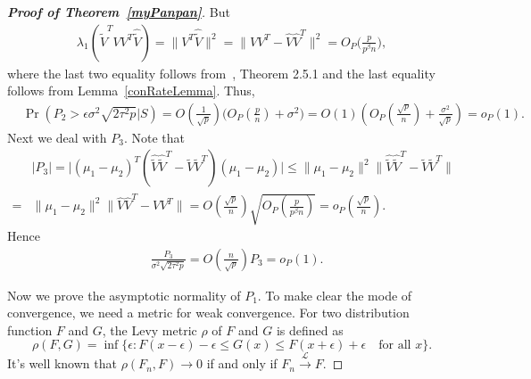 \documentclass[review]{elsarticle}
\theoremstyle{plain}
\theoremstyle{definition}
\theoremstyle{remark}
\begin{document}
\begin{proof}[\textbf{Proof of Theorem~\ref{myPanpan}}]
    But
    \begin{equation*}
        \begin{aligned}
\lambda_1(\hat{\tilde{V}}^T VV^T  \hat{\tilde{V}})
=\|V^T  \hat{\tilde{V}}\|^2
            = \|VV^T-\hat{V}\hat{V}^T\|^2=O_P\Big(\frac{p}{p^{\beta}n}\Big),
        \end{aligned}
    \end{equation*}
    where the last two equality follows from~\cite{matrixComputations}, Theorem 2.5.1 and the last equality follows from Lemma~\ref{conRateLemma}. 
    Thus,
    \begin{equation*}
        \begin{aligned}
            &\Pr({P_2}>\epsilon{\sigma^2\sqrt{2\tau^2 p}}\big|S)
             =
             O(\frac{1}{\sqrt{p}})
             \big(O_P(\frac{p}{n})+\sigma^2\big)
             =O(1)(O_P(\frac{\sqrt{p}}{n})+\frac{\sigma^2}{\sqrt{p}})
             =o_P(1).
        \end{aligned}
    \end{equation*}
    Next we deal with $P_3$.
    Note that
    \begin{equation*}
        \begin{aligned}
            &|P_3|=
            \big|{(\mu_1-\mu_2)}^T(\hat{\tilde{V}}\hat{\tilde{V}}^T-\tilde{V}\tilde{V}^T)(\mu_1-\mu_2)\big|
            \leq 
            \|\mu_1-\mu_2\|^2 \|\hat{\tilde{V}}\hat{\tilde{V}}^T-\tilde{V}\tilde{V}^T\|\\
            =& 
            \|\mu_1-\mu_2\|^2  \|\hat{V}\hat{V}^T-VV^T\|
        =O(\frac{\sqrt{p}}{n})\sqrt{O_P(\frac{p}{p^{\beta}n})}=o_P(\frac{\sqrt{p}}{n}).
        \end{aligned}
    \end{equation*}
    Hence
    \begin{equation*}
        \begin{aligned}
            &\frac{P_3}{\sigma^2\sqrt{2\tau^2 p}}= O(\frac{n}{\sqrt{p}})P_3=o_P(1).
        \end{aligned}
    \end{equation*}

    Now we prove the asymptotic normality of $P_1$.
    To make clear the mode of convergence, we need a metric for weak convergence. For two distribution function $F$ and $G$, the Levy metric $\rho$ of $F$ and $G$ is defined as
    $$
   \rho(F,G) =\inf\{\epsilon:F(x-\epsilon)-\epsilon\leq G(x)\leq F(x+\epsilon)+\epsilon\quad \textrm{for all $x$}\}.
    $$
    It's well known that $\rho(F_n,F)\to 0$ if and only if $F_n\xrightarrow{\mathcal{L}}F$.


\end{proof}
\end{document}
